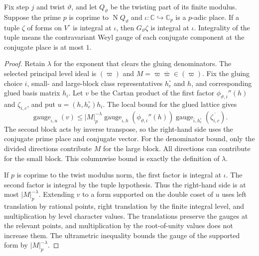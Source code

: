 \begin{lemma}
\label{lem:c-gluing-integrality}
\emitthmsource
Fix step $j$ and twist $\vartheta$, and let $Q_\vartheta$ be the twisting part of its finite modulus. Suppose the prime $p$ is coprime to $\operatorname N Q_\vartheta$ and $\iota\colon\mathbb C\hookrightarrow\mathbb C_p$ is a $p$-adic place. If a tuple $\zeta$ of forms on $V^\circ$ is integral at $\iota$, then $G_\vartheta\zeta$ is integral at $\iota$. Integrality of the tuple means the contravariant Weyl gauge of each conjugate component at the conjugate place is at most $1$.
\end{lemma}

\begin{proof}
Retain $\lambda$ for the exponent that clears the gluing denominators. The selected principal level ideal is $(\varpi)$ and $M=\varpi\overline\varpi\in(\varpi)$. Fix the gluing choice $i$, small- and large-block class representatives $h^\circ_c$ and $h$, and corresponding glued basis matrix $h_i$. Let $v$ be the Cartan product of the first factor $\phi_{\vartheta,i}''(h)$ and $\zeta_{i,c}$, and put $u=(h,h^\circ_c)h_i$. The local bound for the glued lattice gives
\[
 \operatorname{gauge}_{\iota,u}(v)\le
  |M|_p^{-\lambda}
  \operatorname{gauge}_{\iota,h}(\phi_{\vartheta,i}''(h))
  \operatorname{gauge}_{\bar\iota,h^\circ_c}(\overline{\zeta_{i,c}}).
\]
The second block acts by inverse transpose, so the right-hand side uses the conjugate prime place and conjugate vector. For the denominator bound, only the divided directions contribute $M$ for the large block. All directions can contribute for the small block. This columnwise bound is exactly the definition of $\lambda$.

If $p$ is coprime to the twist modulus norm, the first factor is integral at $\iota$. The second factor is integral by the tuple hypothesis. Thus the right-hand side is at most $|M|_p^{-\lambda}$. Extending $v$ to a form supported on the double coset of $u$ uses left translation by rational points, right translation by the finite integral level, and multiplication by level character values. The translations preserve the gauges at the relevant points, and multiplication by the root-of-unity values does not increase them. The ultrametric inequality bounds the gauge of the supported form by $|M|_p^{-\lambda}$.


\end{proof}
